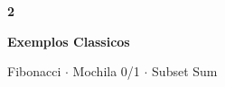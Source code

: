 \documentclass[aspectratio=169,10pt]{beamer}
\begin{document}
{
\begin{frame}[noframenumbering]
  \centering\vspace{1.0cm}
  {\fontsize{36}{44}\selectfont\bfseries\color{gemaBlue} 2}\par
  \vspace{0.22cm}
  {\Large\color{dpTeal}\bfseries Exemplos Classicos}\par
  \vspace{0.14cm}
  {\color{gray}\small Fibonacci $\cdot$ Mochila 0/1 $\cdot$ Subset Sum}
\end{frame}
}

\end{document}
